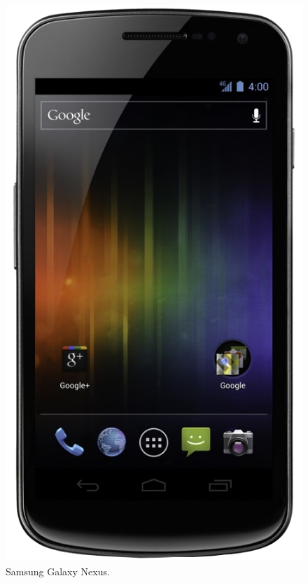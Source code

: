 \begin{figure}
  \centering
    \includegraphics[scale=0.3]{./Introduccion/imagenes/nexus.png}
  \caption{Samsung Galaxy Nexus.}
  \label{fig:nexus}
\end{figure}

